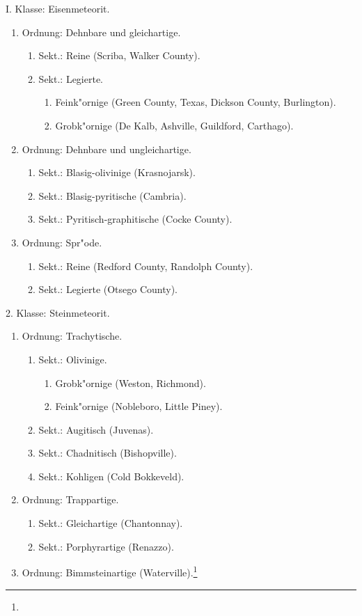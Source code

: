 \documentclass[a4paper, 11pt, oneside]{article}
\begin{document}
\begin{center}
I. Klasse: Eisenmeteorit.
\end{center}
\begin{enumerate}
  \item Ordnung: Dehnbare und gleichartige.
  \begin{enumerate}
    \item Sekt.: Reine (Scriba, Walker County).
    \item Sekt.: Legierte.
    \begin{enumerate}
      \item Feink"ornige (Green County, Texas, Dickson County, Burlington).
      \item Grobk"ornige (De Kalb, Ashville, Guildford, Carthago).
    \end{enumerate}
  \end{enumerate}
  \item Ordnung: Dehnbare und ungleichartige.
  \begin{enumerate}
    \item Sekt.: Blasig-olivinige (Krasnojarsk).
    \item Sekt.: Blasig-pyritische (Cambria).
    \item Sekt.: Pyritisch-graphitische (Cocke County).
  \end{enumerate}
  \item Ordnung: Spr"ode.
  \begin{enumerate}
    \item Sekt.: Reine (Redford County, Randolph County).
    \item Sekt.: Legierte (Otsego County).
  \end{enumerate}
\end{enumerate}

\begin{center}
2. Klasse: Steinmeteorit.
\end{center}
\begin{enumerate}
  \item Ordnung: Trachytische.
  \begin{enumerate}
    \item Sekt.: Olivinige.
    \begin{enumerate}
      \item Grobk"ornige (Weston, Richmond).
      \item Feink"ornige (Nobleboro, Little Piney).
    \end{enumerate}
    \item Sekt.: Augitisch (Juvenas).
    \item Sekt.: Chadnitisch (Bishopville).
    \item Sekt.: Kohligen (Cold Bokkeveld).
  \end{enumerate}
  \item Ordnung: Trappartige.
  \begin{enumerate}
    \item Sekt.: Gleichartige (Chantonnay).
    \item Sekt.: Porphyrartige (Renazzo).
  \end{enumerate}
  \item Ordnung: Bimmsteinartige (Waterville).\footnote{}
\end{enumerate}
\end{document}
